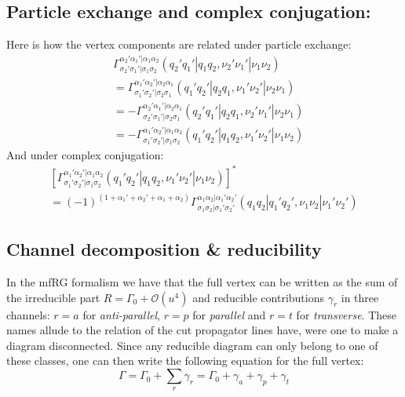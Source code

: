 \documentclass[12pt,a4paper,roman]{article}
\begin{document}
\subsection*{Particle exchange and complex conjugation:}
Here is how the vertex components are related under particle exchange:
\begin{align}
&\Gamma_{\sigma_2'\sigma_1'|\sigma_1\sigma_2}^{\alpha_2'\alpha_1'|\alpha_1\alpha_2}(q_2'q_1'|q_1q_2, \nu_2'\nu_1'|\nu_1\nu_2) \\
&= \Gamma_{\sigma_1'\sigma_2'|\sigma_2\sigma_1}^{\alpha_1'\alpha_2'|\alpha_2\alpha_1}(q_1'q_2'|q_2q_1, \nu_1'\nu_2'|\nu_2\nu_1) \\
&= - \Gamma_{\sigma_2'\sigma_1'|\sigma_2\sigma_1}^{\alpha_2'\alpha_1'|\alpha_2\alpha_1}(q_2'q_1'|q_2q_1, \nu_2'\nu_1'|\nu_2\nu_1) \\
&= - \Gamma_{\sigma_1'\sigma_2'|\sigma_1\sigma_2}^{\alpha_1'\alpha_2'|\alpha_1\alpha_2}(q_1'q_2'|q_1q_2, \nu_1'\nu_2'|\nu_1\nu_2)
\end{align}
And under complex conjugation:
\begin{multline}
\left[ \Gamma_{\sigma_1'\sigma_2'|\sigma_1\sigma_2}^{\alpha_1'\alpha_2'|\alpha_1\alpha_2}(q_1'q_2'|q_1q_2, \nu_1'\nu_2'|\nu_1\nu_2) \right]^* \\ =
(-1)^{(1+\alpha_1'+\alpha_2'+\alpha_1+\alpha_2)} \Gamma_{\sigma_1\sigma_2|\sigma_1'\sigma_2'}^{\alpha_1\alpha_2|\alpha_1'\alpha_2'}(q_1q_2|q_1'q_2', \nu_1\nu_2|\nu_1'\nu_2')
\end{multline}

\subsection*{Channel decomposition \& reducibility}
In the mfRG formalism we have that the full vertex can be written as the sum of the irreducible part $R = \Gamma_0 + \mathcal{O}(u^4)$ and reducible contributions $\gamma_r$ in three channels: $r=a$ for \textit{anti-parallel}, $r=p$ for \textit{parallel} and $r=t$ for \textit{transverse}. These names allude to the relation of the cut propagator lines have, were one to make a diagram disconnected. Since any reducible diagram can only belong to one of these classes, one can then write the following equation for the full vertex:
\begin{equation}
	\Gamma = \Gamma_0 + \sum_r \gamma_r = \Gamma_0 + \gamma_a + \gamma_p + \gamma_t
	\label{eq:simpleGammaDef}
\end{equation}
\end{document}
